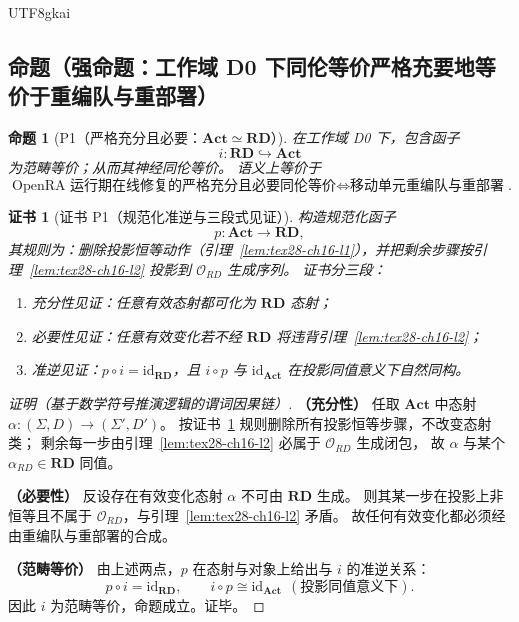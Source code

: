 \documentclass[12pt]{article}
\newtheorem{proposition}{命题}[section]
\newtheorem{Certificate}{证书}[section]
\begin{document}
\begin{CJK*}{UTF8}{gkai}
\subsection{命题（强命题：工作域 D0 下同伦等价严格充要地等价于重编队与重部署）}
\label{subsec:tex28-ch16-props}

\begin{proposition}[P1（严格充分且必要：$\mathbf{Act}\simeq\mathbf{RD}$）]
\label{prop:tex28-ch16-p1}
在工作域 D0 下，包含函子
\[
  i:\mathbf{RD}\hookrightarrow\mathbf{Act}
\]
为范畴等价；从而其神经同伦等价。
语义上等价于
\[
  \boxed{
    \text{OpenRA 运行期在线修复的严格充分且必要同伦等价}
    \Longleftrightarrow
    \text{移动单元重编队与重部署}
  }.
\]
\end{proposition}

\begin{Certificate}[证书 P1（规范化准逆与三段式见证）]
\label{cert:tex28-ch16-p1}
构造规范化函子
\[
  p:\mathbf{Act}\to\mathbf{RD},
\]
其规则为：删除投影恒等动作（引理~\ref{lem:tex28-ch16-l1}），并把剩余步骤按引理~\ref{lem:tex28-ch16-l2} 投影到
$\mathcal O_{RD}$ 生成序列。
证书分三段：
\begin{enumerate}
  \item 充分性见证：任意有效态射都可化为 $\mathbf{RD}$ 态射；
  \item 必要性见证：任意有效变化若不经 $\mathbf{RD}$ 将违背引理~\ref{lem:tex28-ch16-l2}；
  \item 准逆见证：$p\circ i=\mathrm{id}_{\mathbf{RD}}$，且 $i\circ p$ 与 $\mathrm{id}_{\mathbf{Act}}$ 在投影同值意义下自然同构。
\end{enumerate}
\end{Certificate}

\begin{proof}[证明（基于数学符号推演逻辑的谓词因果链）]
\textbf{（充分性）}
任取 $\mathbf{Act}$ 中态射 $\alpha:(\Sigma,D)\to(\Sigma',D')$。
按证书~\ref{cert:tex28-ch16-p1} 规则删除所有投影恒等步骤，不改变态射类；
剩余每一步由引理~\ref{lem:tex28-ch16-l2} 必属于 $\mathcal O_{RD}$ 生成闭包，
故 $\alpha$ 与某个 $\alpha_{RD}\in\mathbf{RD}$ 同值。

\textbf{（必要性）}
反设存在有效变化态射 $\alpha$ 不可由 $\mathbf{RD}$ 生成。
则其某一步在投影上非恒等且不属于 $\mathcal O_{RD}$，与引理~\ref{lem:tex28-ch16-l2} 矛盾。
故任何有效变化都必须经由重编队与重部署的合成。

\textbf{（范畴等价）}
由上述两点，$p$ 在态射与对象上给出与 $i$ 的准逆关系：
\[
  p\circ i=\mathrm{id}_{\mathbf{RD}},
  \qquad
  i\circ p\cong \mathrm{id}_{\mathbf{Act}}
  \ \ (\text{投影同值意义下}).
\]
因此 $i$ 为范畴等价，命题成立。证毕。
\end{proof}


\end{CJK*}
\end{document}
